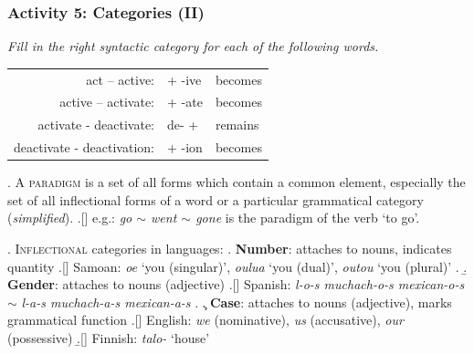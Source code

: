 \documentclass[11pt, oneside]{article}   	%
\begin{document}
\subsubsection{Activity 5: Categories (II)}

{\itshape Fill in the right syntactic category for each of the following words.} \\

\begin{tabular}{r l l}
act -- active: & \underline{\hspace{1cm}} + -ive & becomes \underline{\hspace{1cm}} \\
active -- activate:	& \underline{\hspace{1cm}} + -ate & becomes \underline{\hspace{1cm}} \\	                    
activate - deactivate: & de- + \underline{\hspace{1cm}} & remains \underline{\hspace{1cm}} \\         
deactivate - deactivation:	& \underline{\hspace{1cm}} + -ion & becomes \underline{\hspace{1cm}} \\
\end{tabular}

\ex. A {\scshape paradigm} is a set of all forms which contain a common element, especially the set of all inflectional forms of a word or a particular grammatical category ({\em simplified}).
	\a.[] e.g.: {\em go $\sim$ went $\sim$ gone} is the paradigm of the verb `to go'.

\ex. {\scshape Inflectional} categories in languages:
\a. {\bf Number}: attaches to nouns, indicates quantity
	\a.[] Samoan: {\it {}oe} `you (singular)',  {\it {}oulua} `you (dual)', {\it {}outou} `you (plural)'
	\z.  
\b. {\bf Gender}: attaches to nouns (adjective)
	\a.[] Spanish: {\it l-o-s muchach-o-s mexican-o-s} $\sim$ {\it l-a-s muchach-a-s mexican-a-s}
	\z.
\c. {\bf Case}: attaches to nouns (adjective), marks grammatical function
	\a.[] English: {\it we} (nominative), {\it us} (accusative), {\it our} (possessive)
	\b.[] Finnish: {\it talo-} `house'
	
\end{document}
